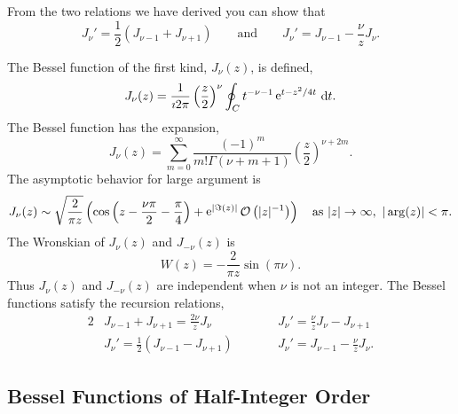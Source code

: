 From the two relations we have derived you can show that
\[
\boxed{
  J_\nu' = \frac{1}{2} (J_{\nu-1} + J_{\nu+1})
  } 
\qquad \mathrm{and} \qquad 
\boxed{
  J_\nu' = J_{\nu-1} - \frac{\nu}{z} J_\nu.
  }
\]





\begin{Result}
  The Bessel function of the first kind, $J_\nu(z)$,  is defined,
  \[ 
  J_\nu(z) = \frac{1}{\imath 2 \pi} \left(\frac{z}{2} \right)^\nu \oint_C t^{-\nu-1}
  \mathop{\mathrm{e}}\nolimits^{t - z^2/4t}\,\mathrm{d} t. 
  \]
  The Bessel function has the expansion,
  \[ 
  J_\nu(z) = \sum_{m = 0}^\infty \frac{(-1)^m}{m! \Gamma(\nu+m+1)} \left( \frac{z}{2} \right)^{\nu+2m}. 
  \]
  The asymptotic behavior for large argument is
  \[
  J_\nu(z) \sim \sqrt{ \frac{2}{\pi z} } \left(
    \cos \left( z - \frac{\nu \pi}{2} - \frac{\pi}{4} \right) 
    + \mathop{\mathrm{e}}\nolimits^{|\Im(z)|} \mathcal{O}\left( |z|^{-1} \right) \right)
  \quad \mathrm{as}\ |z| \to \infty, ~ |\arg(z)| < \pi.
  \]
  The Wronskian of $J_\nu(z)$ and $J_{-\nu}(z)$ is
  \[ 
  W(z) = -\frac{2}{\pi z} \sin(\pi \nu). 
  \]
  Thus $J_\nu(z)$ and $J_{-\nu}(z)$ are independent when $\nu$ is not 
  an integer.
  The Bessel functions satisfy the recursion relations,
  \begin{alignat*}{2}
    &J_{\nu-1} + J_{\nu+1} = \frac{2\nu}{z} J_\nu &\qquad
    &J_\nu' = \frac{\nu}{z} J_\nu - J_{\nu+1} \\
    &J_\nu' = \frac{1}{2} (J_{\nu-1} - J_{\nu+1}) &\qquad
    &J_\nu' = J_{\nu-1} - \frac{\nu}{z} J_\nu.
  \end{alignat*}
\end{Result}


















\subsection{Bessel Functions of Half-Integer Order}

